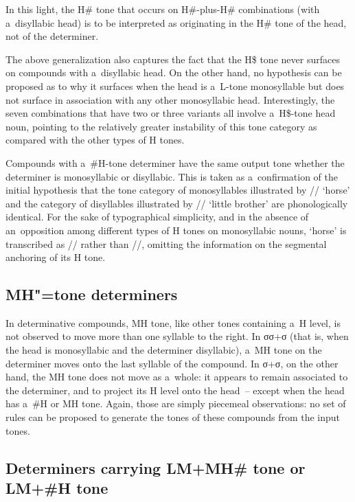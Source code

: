 In this light, the H\# tone that occurs on H\#-plus-H\# combinations (with a~disyllabic head) is to be interpreted as originating in the H\# tone of the head, not of the determiner.

The above generalization also captures the fact that the H\$ tone never surfaces on compounds with
a~disyllabic head. On the other hand, no hypothesis can be proposed as to why it surfaces when the head is a~L-tone
monosyllable but does not surface in association with any other monosyllabic head. Interestingly, the seven
combinations that have two or three variants all involve a~H\$-tone head noun, pointing to the relatively greater instability of this tone category as compared with the other types of H tones.

Compounds with a~\#H-tone determiner have the same output tone whether the determiner is
monosyllabic or disyllabic. This is taken as a~confirmation of the initial hypothesis that the tone
category of monosyllables illustrated by // ‘horse’ and the category of disyllables
illustrated by // ‘little brother’ are phonologically identical. For the sake of
typographical simplicity, and in the absence of an~opposition among different types of H tones on
monosyllabic nouns, ‘horse’ is transcribed as // rather than //,
omitting the information on the segmental anchoring of its H tone.

\subsection{MH"=tone determiners}
\label{sec:MHtonedems}

In determinative compounds, MH tone, like other tones containing a~H level, is not observed to move
more than one syllable to the right. In σσ+σ (that is, when the head is monosyllabic and the determiner disyllabic),
a~MH tone on the determiner moves onto the last syllable of the compound. In σ+σ, on the other hand,
the MH tone does not move as a~whole: it appears to remain associated to the determiner, and to project
its H level onto the head~-- except when the head has a~\#H or MH tone. Again, those are simply
piecemeal observations: no set of rules can be proposed to generate the tones of these compounds
from the input tones.

\subsection{Determiners carrying LM+MH\# tone or LM+\#H tone}


